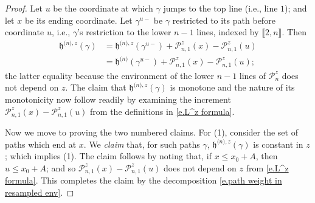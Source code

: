 \documentclass[oneside,final,11pt]{amsart}
\theoremstyle{definition}
\renewcommand{\L}{\CP}
\newcommand{\fh}{\mathfrak{h}}
\newcommand{\h}{\fh^{{\scriptscriptstyle(}n{\scriptscriptstyle)}}}
\newcommand{\hz}[1]{\fh^{{\scriptscriptstyle(}n{\scriptscriptstyle)},#1}}
\newcommand{\1}[1]{\mathbf{1}_{#1}}
\newcommand{\CP}{\mathcal{P}}
\numberwithin{equation}{section}
\begin{document}
\begin{proof}
Let $u$ be the coordinate at which $\gamma$ jumps to the top line (i.e., line $1$); and let $x$ be its ending coordinate. Let $\gamma^{u-}$ be $\gamma$ restricted to its path before coordinate $u$, i.e., $\gamma$'s restriction to the lower $n-1$ lines,  indexed by $\llbracket 2,n \rrbracket$. Then
%
\begin{align}
\hz{z}(\gamma) &= \hz{z}(\gamma^{u-}) + \L_{n,1}^{z}(x) - \L_{n,1}^z(u)\nonumber\\
%
&= \h(\gamma^{u-}) + \L_{n,1}^{z}(x) - \L_{n,1}^z(u);\label{e.path weight in resampled env}
\end{align}
%
the latter equality because the environment of the lower $n-1$ lines of $\L^z_n$ does not depend on $z$. The claim that $\hz{z}(\gamma)$ is monotone and the nature of its monotonicity now follow readily by examining the increment $\L_{n,1}^z(x) - \L_{n,1}^z(u)$ from the definitions in \eqref{e.L^z formula}.

Now we move to proving the two numbered claims.
%
For (1), consider the set of paths which end at $x$. We {\em claim} that, for such paths $\gamma$, $\hz{z}(\gamma)$ is constant in $z$;  which implies (1). The claim follows by noting that, if $x\leq x_0+A$, then $u\leq x_0+A$; and so $\L_{n,1}^{z}(x) - \L_{n,1}^{z}(u)$ does not depend on $z$ from \eqref{e.L^z formula}. This completes the claim by the decomposition \eqref{e.path weight in resampled env}.


\end{proof}
\end{document}
